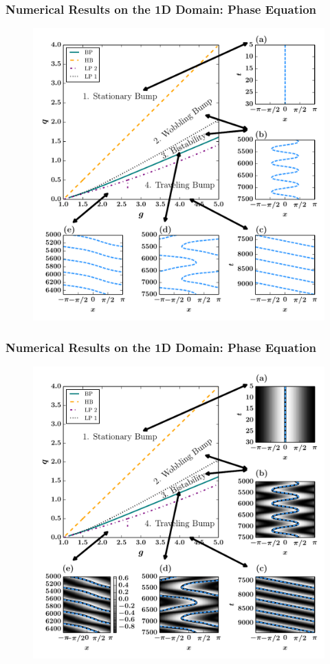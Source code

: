 \documentclass{beamer}
\begin{document}
\begin{frame}
\frametitle{Numerical Results on the 1D Domain: Phase Equation}
\begin{figure}
 \includegraphics[width=.7\textwidth]{oned_phase_2par5.pdf}
\end{figure}
\end{frame}

\begin{frame}
\frametitle{Numerical Results on the 1D Domain: Phase Equation}
\begin{figure}
 \includegraphics[width=.7\textwidth]{oned_phase_2par5b.pdf}
\end{figure}
\end{frame}
\end{document}
